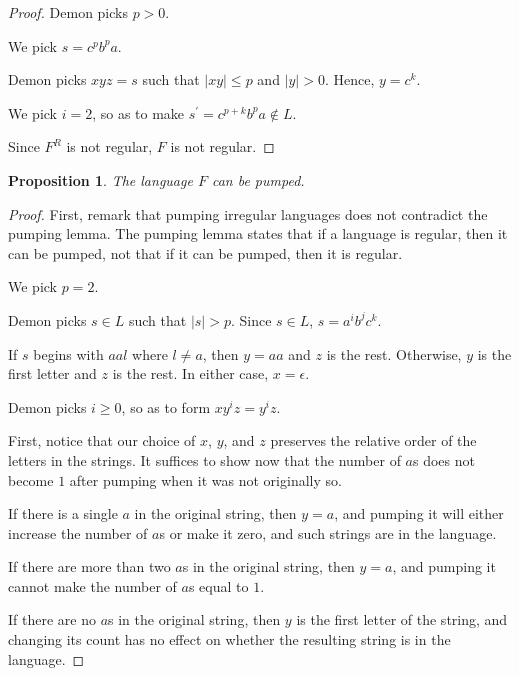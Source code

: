 \documentclass{article}
\newtheorem{proposition}{Proposition}
\begin{document}
\begin{enumerate}
\begin{proof}
            Demon picks $p > 0$.

            We pick $s = c^p b^p a$.

            Demon picks $xyz = s$ such that $|xy| \leq p$ and $|y| > 0$. Hence,
            $y = c^k$.

            We pick $i = 2$, so as to make 
            $s^\prime = c^{p + k} b^p a \notin L$.

            Since $F^R$ is not regular, $F$ is not regular.
        \end{proof}

        \begin{proposition}
            The language $F$ can be pumped.
        \end{proposition}

        \begin{proof}
            First, remark that pumping irregular languages does not contradict
            the pumping lemma. The pumping lemma states that if a language is
            regular, then it can be pumped, not that if it can be pumped, then
            it is regular.

            We pick $p = 2$.

            Demon picks $s \in L$ such that $|s| > p$. Since $s \in L$,
            $s = a^i b^j c^k$.

            If $s$ begins with $aal$ where $l \neq a$, then $y = aa$ and $z$ is
            the rest. Otherwise, $y$ is the first letter and $z$ is the rest.
            In either case, $x = \epsilon$.

            Demon picks $i \geq 0$, so as to form $x y^i z = y^i z$.

            First, notice that our choice of $x$, $y$, and $z$ preserves the
            relative order of the letters in the strings. It suffices to show
            now that the number of $a$s does not become $1$ after pumping
            when it was not originally so.

            If there is a single $a$ in the original string, then $y = a$, and
            pumping it will either increase the number of $a$s or make it zero,
            and such strings are in the language.

            If there are more than two $a$s in the original string, then 
            $y = a$, and pumping it cannot make the number of $a$s equal to
            $1$.

            If there are no $a$s in the original string, then $y$ is the first
            letter of the string, and changing its count has no effect on
            whether the resulting string is in the language.
        \end{proof}


\end{enumerate}
\end{document}
